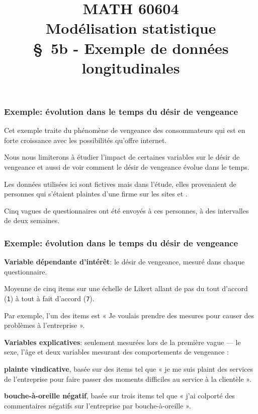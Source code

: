 \documentclass{beamer}
\title[\color{white}{MATH 60604 \S~5b - Exemple de données longitudinales}]{\texorpdfstring{MATH 60604 \\Modélisation statistique \\ \S~5b - Exemple de données longitudinales}{MATH 60604 \\Modélisation statistique \\ \S~5b - Exemple de données longitudinales}}
\author{}
\institute{HEC Montréal\\
Département de sciences de la décision}
\date{}
\begin{document}
\frame{\titlepage}

\begin{frame}
\frametitle{Exemple: évolution dans le temps du désir de vengeance}
\bi
\item Cet exemple traite du phénomène de vengeance des consommateurs qui est en forte croissance avec les possibilités qu'offre internet. 
\item Nous nous limiterons à étudier l'impact de certaines variables sur le désir de vengeance et aussi de voir comment le désir de vengeance évolue dans le temps. 

\item Les données utilisées ici sont fictives mais dans l'étude, elles provenaient de personnes qui s'étaient plaintes d'une firme sur les sites  et .
\item Cinq vagues de questionnaires ont été envoyés à ces personnes, à des intervalles de deux semaines.
\ei
\end{frame}

\begin{frame}
\frametitle{Exemple: évolution dans le temps du désir de vengeance }
\bi
\item \textbf{Variable dépendante d'intérêt}: le désir de vengeance, mesuré dans chaque questionnaire. 
\bi

\item Moyenne de cinq items sur une échelle de Likert allant de pas du tout d'accord (\texttt{1}) à tout à fait d'accord (\texttt{7}). 
\item Par exemple, l'un des items est « Je voulais prendre des mesures pour causer des problèmes à l'entreprise ».
\ei
\item \textbf{Variables explicatives}: seulement mesurées lors de la première vague --- le sexe, l'âge et deux variables mesurant des comportements de vengeance :
\bi
\item \textbf{plainte vindicative}, basée sur des items tel que « je me suis plaint des services de l'entreprise pour faire passer des moments difficiles au service à la clientèle ».
\item \textbf{bouche-à-oreille négatif}, basée sur trois items tel que « j'ai colporté des commentaires négatifs sur l'entreprise par bouche-à-oreille ».
\ei
\ei
\end{frame}
\end{document}
